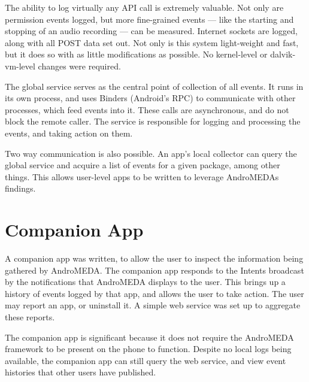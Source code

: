 The ability to log virtually any API call is extremely valuable. Not only are permission events logged, but more fine-grained events --- like the starting and stopping of an audio recording --- can be measured. Internet sockets are logged, along with all POST data set out. Not only is this system light-weight and fast, but it does so with as little modifications as possible. No kernel-level or dalvik-vm-level changes were required.

The global service serves as the central point of collection of all events. It runs in its own process, and uses Binders (Android's RPC) to communicate with other processes, which feed events into it. These calls are asynchronous, and do not block the remote caller. The service is responsible for logging and processing the events, and taking action on them.

Two way communication is also possible. An app's local collector can query the global service and acquire a list of events for a given package, among other things. This allows user-level apps to be written to leverage AndroMEDAs findings.

\section{Companion App}
A companion app was written, to allow the user to inspect the information being gathered by AndroMEDA. The companion app responds to the Intents broadcast by the notifications that AndroMEDA displays to the user. This brings up a history of events logged by that app, and allows the user to take action. The user may report an app, or uninstall it. A simple web service was set up to aggregate these reports.

The companion app is significant because it does not require the AndroMEDA framework to be present on the phone to function. Despite no local logs being available, the companion app can still query the web service, and view event histories that other users have published.
